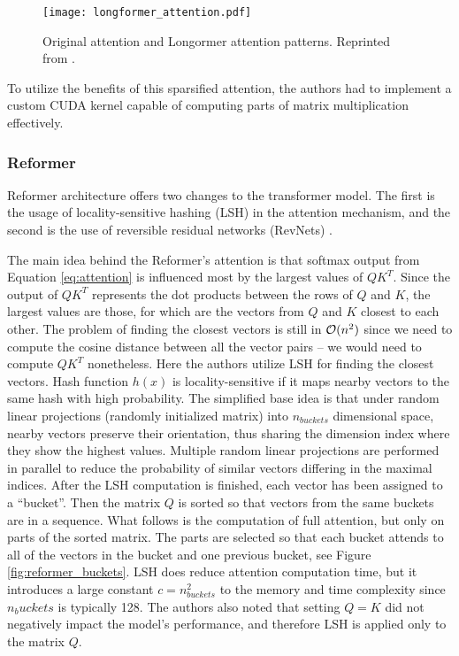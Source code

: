\begin{figure}[!htb]
        \centering
        \texttt{[image: longformer\_attention.pdf]}
        \caption[Longformer Attention Patterns]{Original attention and Longormer attention patterns. Reprinted from \citep{longformer}.}
        \label{fig:longformer_attention}
\end{figure}

To utilize the benefits of this sparsified attention, the authors had to implement a custom CUDA kernel capable of computing parts of matrix multiplication effectively. 

\subsubsection{Reformer}

Reformer architecture \citep{reformer} offers two changes to the transformer model.
The first is the usage of locality-sensitive hashing (LSH) \citep{lsh} in the attention mechanism, and the second is the use of reversible residual networks (RevNets) \citep{revnets}.

The main idea behind the Reformer's attention is that softmax output from Equation \ref{eq:attention} is influenced most by the largest values of $QK^T$. 
Since the output of $QK^T$ represents the dot products between the rows of $Q$ and $K$, the largest values are those, for which are the vectors from $Q$ and $K$ closest to each other.
The problem of finding the closest vectors is still in $\mathcal{O}(n^2)$ since we need to compute the cosine distance between all the vector pairs -- we would need to compute $QK^T$ nonetheless. %
Here the authors utilize LSH for finding the closest vectors.
Hash function $h(x)$ is locality-sensitive if it maps nearby vectors to the same hash with high probability. 
The simplified base idea is that under random linear projections (randomly initialized matrix) into $n_{buckets}$ dimensional space, nearby vectors preserve their orientation, thus sharing the dimension index where they show the highest values.
Multiple random linear projections are performed in parallel to reduce the probability of similar vectors differing in the maximal indices.
After the LSH computation is finished, each vector has been assigned to a ``bucket''.
Then the matrix $Q$ is sorted so that vectors from the same buckets are in a sequence.
What follows is the computation of full attention, but only on parts of the sorted matrix.
The parts are selected so that each bucket attends to all of the vectors in the bucket and one previous bucket, see Figure \ref{fig:reformer_buckets}.
LSH does reduce attention computation time, but it introduces a large constant $c=n_{buckets}^2$ to the memory and time complexity since $n_buckets$ is typically 128.
The authors also noted that setting $Q=K$ did not negatively impact the model's performance, and therefore LSH is applied only to the matrix $Q$.

